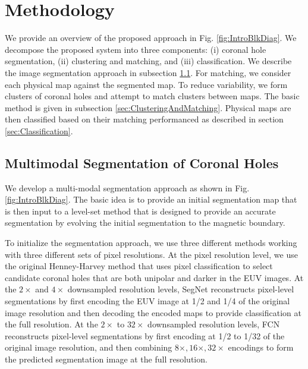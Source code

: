 \documentclass[journal]{IEEEtran}
\begin{document}








\section{Methodology}\label{sec:methodology}
We provide an overview of the proposed approach in Fig. \ref{fig:IntroBlkDiag}.
We decompose the proposed system into three components:
(i) coronal hole segmentation,
(ii) clustering and matching, and
(iii) classification.
We describe the image segmentation approach in
subsection \ref{sec:Segmentation}.
For matching, we consider each physical map against
the segmented map.
To reduce variability, we form clusters of coronal holes
and attempt to match clusters between maps.
The basic method is given in subsection \ref{sec:ClusteringAndMatching}.
Physical maps are then classified based on
their matching performanced
as described in section \ref{sec:Classification}.\\

\color{blue}
\subsection{Multimodal Segmentation of Coronal Holes}\label{sec:Segmentation} 
We develop a multi-modal segmentation approach as shown
   in Fig. \ref{fig:IntroBlkDiag}.
The basic idea is to provide an initial segmentation
   map that is then input to a level-set method
   that is designed to 
   provide an accurate segmentation by evolving the
   initial segmentation to the magnetic boundary.
   
To initialize the segmentation approach, we use
   three different methods working
   with three different sets of pixel resolutions.
At the pixel resolution level, we use the original
   Henney-Harvey method \cite{Henney2005}
   that uses pixel classification 
   to select candidate coronal holes that are both
   unipolar and darker in the EUV images.
At the $2\times$ and $4\times$ downsampled resolution levels,
   SegNet reconstructs pixel-level segmentations
   by first encoding the EUV image 
   at 1/2 and 1/4 of the original image resolution
   and then decoding the encoded maps to provide
   classification at the full resolution.
At the $2\times$ to $32\times$ downsampled resolution levels,
   FCN reconstructs pixel-level segmentations by
   first encoding at 1/2 to 1/32 of the original image resolution,
   and then combining $8\times, 16\times, 32\times$ encodings to
   form the predicted segmentation image at the full resolution.
   
\end{document}
